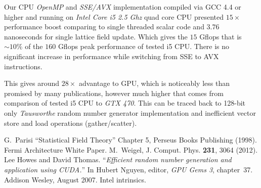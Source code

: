 \documentclass[a4paper]{llncs}
\begin{document}
Our CPU \emph{OpenMP} and \emph{SSE/AVX} implementation compiled via
GCC 4.4 or higher and running on \emph{Intel Core i5 2.5 Ghz} quad
core CPU presented $15\times$ performance boost comparing to single
threaded scalar code and $3.76$ nanoseconds for single lattice field
update.  Which gives the $15$ Gflops that is $\sim10\%$ of the  $160$
Gflops peak performance of tested i5 CPU. There is no significant
increase in performance while switching from SSE to AVX instructions.

This gives around $28\times$ advantage to GPU, which is noticeably
less than promised by many publications, however much higher that
comes from comparison of  tested i5
CPU to \emph{GTX 470}. This can be
traced back to 128-bit only \emph{Tausworthe} random number generator
implementation and inefficient vector store and load operations
(gather/scatter).

\begin{thebibliography}{9}
 G.~Parisi ``Statistical Field Theory'' Chapter 5, Perseus
Books Publishing (1998).
 Fermi Architecture White Paper. 
 M.~Weigel, J. Comput. Phys. \textbf{231}, 3064 (2012).
Lee Howes and David Thomas.
``{\em Efficient random number generation and application using {CUDA}.}''
In Hubert Nguyen, editor, {\em GPU Gems 3}, chapter~37. Addison
  Wesley, August 2007.
 Intel intrinsics. 
\end{thebibliography}
\end{document}
